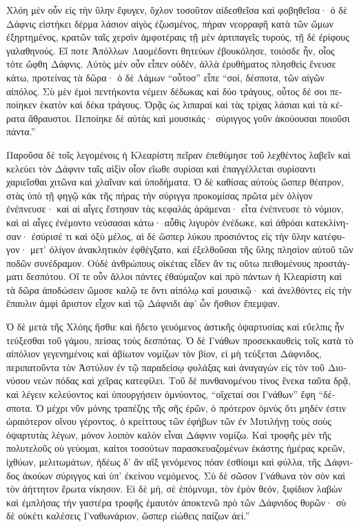\documentclass{book}
\begin{document}
\begin{pairs}
\begin{Leftside}
\begin{greek}
  Χλόη μὲν οὖν εἰς τὴν ὕλην ἔφυγεν, ὄχλον τοσοῦτον αἰδεσθεῖσα καὶ φοβηθεῖσα· ὁ δὲ Δάφνις εἱστήκει δέρμα λάσιον αἰγὸς ἐζωσμένος, πήραν νεορραφῆ κατὰ τῶν ὤμων ἐξηρτημένος, κρατῶν ταῖς χερσὶν ἀμφοτέραις τῇ μὲν ἀρτιπαγεῖς τυρούς, τῇ δὲ ἐρίφους γαλαθηνούς.  Εἴ ποτε Ἀπόλλων Λαομέδοντι θητεύων ἐβουκόλησε, τοιόσδε ἦν, οἷος τότε ὤφθη Δάφνις. Αὐτὸς μὲν οὖν εἶπεν οὐδέν, ἀλλὰ ἐρυθήματος πλησθεὶς ἔνευσε κάτω, προτείνας τὰ δῶρα· ὁ δὲ Λάμων “οὗτοσ”  εἶπε “σοί, δέσποτα, τῶν αἰγῶν αἰπόλος. Σὺ μὲν ἐμοὶ πεντήκοντα νέμειν δέδωκας καὶ δύο τράγους, οὗτος δέ σοι πεποίηκεν ἑκατὸν καὶ δέκα τράγους. Ὁρᾷς ὡς λιπαραὶ καὶ τὰς τρίχας λάσιαι καὶ τὰ κέρατα ἄθραυστοι. Πεποίηκε δὲ αὐτὰς καὶ μουσικάς· σύριγγος γοῦν ἀκούουσαι ποιοῦσι πάντα.”
\pend


  Παροῦσα δὲ τοῖς λεγομένοις ἡ Κλεαρίστη πεῖραν ἐπεθύμησε τοῦ λεχθέντος λαβεῖν καὶ κελεύει τὸν Δάφνιν ταῖς αἰξὶν οἷον εἴωθε συρίσαι καὶ ἐπαγγέλλεται συρίσαντι χαριεῖσθαι χιτῶνα καὶ χλαῖναν καὶ ὑποδήματα.  Ὁ δὲ καθίσας αὐτοὺς ὥσπερ θέατρον, στὰς ὑπὸ τῇ φηγῷ κἀκ τῆς πήρας τὴν σύριγγα προκομίσας πρῶτα μὲν ὀλίγον ἐνέπνευσε· καὶ αἱ αἶγες ἔστησαν τὰς κεφαλὰς ἀράμεναι· εἶτα ἐνέπνευσε τὸ νόμιον, καὶ αἱ αἶγες ἐνέμοντο νεύσασαι κάτω· αὖθις λιγυρὸν ἐνέδωκε,  καὶ ἀθρόαι κατεκλίνησαν· ἐσύρισέ τι καὶ ὀξὺ μέλος, αἱ δὲ ὥσπερ λύκου προσιόντος εἰς τὴν ὕλην κατέφυγον· μετ’ ὀλίγον ἀνακλητικὸν ἐφθέγξατο, καὶ ἐξελθοῦσαι τῆς ὕλης πλησίον αὐτοῦ τῶν ποδῶν συνέδραμον.  Οὐδὲ ἀνθρώπους οἰκέτας εἶδεν ἄν τις οὕτω πειθομένους προστάγματι δεσπότου. Οἵ τε οὖν ἄλλοι πάντες ἐθαύμαζον καὶ πρὸ πάντων ἡ Κλεαρίστη καὶ τὰ δῶρα ἀποδώσειν ὤμοσε καλῷ τε ὄντι αἰπόλῳ καὶ μουσικῷ· καὶ ἀνελθόντες εἰς τὴν ἔπαυλιν ἀμφὶ ἄριστον εἶχον καὶ τῷ Δάφνιδι ἀφ’ ὧν ἤσθιον ἔπεμψαν.
\pend


  Ὁ δὲ μετὰ τῆς Χλόης ἤσθιε καὶ ἥδετο γευόμενος ἀστικῆς ὀψαρτυσίας καὶ εὔελπις ἦν τεύξεσθαι τοῦ γάμου, πείσας τοὺς δεσπότας. Ὁ δὲ Γνάθων προσεκκαυθεὶς τοῖς κατὰ τὸ αἰπόλιον γεγενημένοις καὶ ἀβίωτον νομίζων τὸν βίον, εἰ μὴ τεύξεται Δάφνιδος, περιπατοῦντα τὸν Ἀστύλον ἐν τῷ παραδείσῳ φυλάξας καὶ ἀναγαγὼν εἰς τὸν τοῦ Διονύσου νεὼν πόδας καὶ χεῖρας κατεφίλει.  Τοῦ δὲ πυνθανομένου τίνος ἕνεκα ταῦτα δρᾷ, καὶ λέγειν κελεύοντος καὶ ὑπουργήσειν ὀμνύοντος, “οἴχεταί σοι Γνάθων” ἔφη “δέσποτα. Ὁ μέχρι νῦν μόνης τραπέζης τῆς σῆς ἐρῶν, ὁ πρότερον ὀμνὺς ὅτι μηδέν ἐστιν ὡραιότερον οἴνου γέροντος, ὁ κρείττους τῶν ἐφήβων τῶν ἐν Μυτιλήνῃ τοὺς σοὺς ὀψαρτυτὰς λέγων, μόνον λοιπὸν καλὸν εἶναι Δάφνιν νομίζω.  Καὶ τροφῆς μὲν τῆς πολυτελοῦς οὐ γεύομαι, καίτοι τοσούτων παρασκευαζομένων ἑκάστης ἡμέρας κρεῶν, ἰχθύων, μελιτωμάτων, ἡδέως δ’ ἂν αἲξ γενόμενος πόαν ἐσθίοιμι καὶ φύλλα, τῆς Δάφνιδος ἀκούων σύριγγος καὶ ὑπ’ ἐκείνου νεμόμενος. Σὺ δὲ σῶσον Γνάθωνα τὸν σὸν καὶ τὸν ἀήττητον ἔρωτα νίκησον.  Εἰ δὲ μή, σὲ ἐπόμνυμι, τὸν ἐμὸν θεόν, ξιφίδιον λαβὼν καὶ ἐμπλήσας τὴν γαστέρα τροφῆς ἐμαυτὸν ἀποκτενῶ πρὸ τῶν Δάφνιδος θυρῶν· σὺ δὲ οὐκέτι καλέσεις Γναθωνάριον, ὥσπερ εἰώθεις παίζων ἀεί.”
\pend



\end{greek}
\end{Leftside}
\end{pairs}
\end{document}
